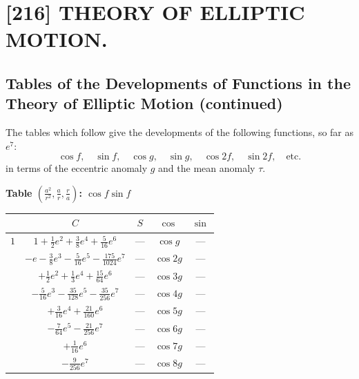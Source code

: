 \documentclass[11pt,a4paper]{article}
\theoremstyle{plain}
\theoremstyle{definition}
\theoremstyle{remark}
\begin{document}

\section*{[216] THEORY OF ELLIPTIC MOTION.}

\subsection*{Tables of the Developments of Functions in the Theory of Elliptic Motion (continued)}

The tables which follow give the developments of the following functions, so far as $e^7$:
\[
\cos f, \quad \sin f, \quad \cos g, \quad \sin g, \quad \cos 2f, \quad \sin 2f, \quad \text{etc.}
\]
in terms of the eccentric anomaly $g$ and the mean anomaly $\tau$.

\vspace{1em}

\noindent\textbf{Table $(\frac{a^2}{r^2}, \frac{a}{r}, \frac{r}{a})$: $\cos f \sin f$}

\vspace{0.5em}

\begin{center}
\begin{tabular}{|c|c|c|c|c|}
\hline
& $C$ & $S$ & $\cos$ & $\sin$ \\
\hline
$1$ & $1 + \frac{1}{2}e^2 + \frac{3}{8}e^4 + \frac{5}{16}e^6$ & --- & $\cos g$ & --- \\
& $-e - \frac{3}{8}e^3 - \frac{5}{16}e^5 - \frac{175}{1024}e^7$ & --- & $\cos 2g$ & --- \\
& $+ \frac{1}{2}e^2 + \frac{1}{3}e^4 + \frac{15}{64}e^6$ & --- & $\cos 3g$ & --- \\
& $- \frac{5}{16}e^3 - \frac{35}{128}e^5 - \frac{35}{256}e^7$ & --- & $\cos 4g$ & --- \\
& $+ \frac{3}{16}e^4 + \frac{21}{160}e^6$ & --- & $\cos 5g$ & --- \\
& $- \frac{7}{64}e^5 - \frac{21}{256}e^7$ & --- & $\cos 6g$ & --- \\
& $+ \frac{1}{16}e^6$ & --- & $\cos 7g$ & --- \\
& $- \frac{9}{256}e^7$ & --- & $\cos 8g$ & --- \\
\hline
\end{tabular}
\end{center}
\end{document}
